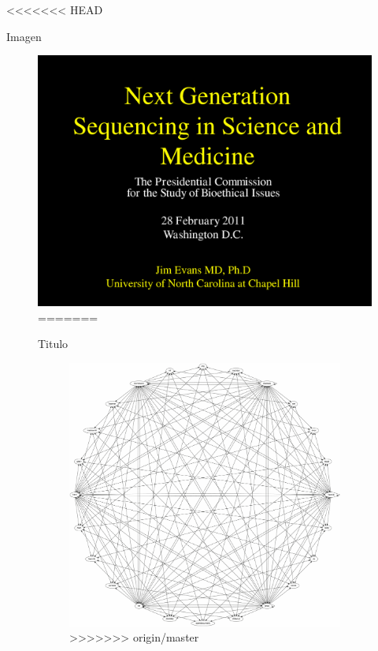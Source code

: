 <<<<<<< HEAD
\begin{frame}{Imagen}

\begin{figure}[htbp]
\centering
\includegraphics{images/foto}
=======
\begin{frame}{Titulo}

\begin{figure}[htbp]
\centering
\includegraphics{images/diagram}
>>>>>>> origin/master
\end{figure}


\end{frame}
\end{figure}
\end{frame}
